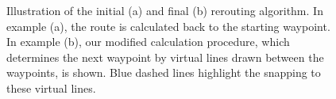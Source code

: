 \begin{figure}[t]
\centering
{}
\caption{Illustration of the initial (a) and final (b) rerouting algorithm. In example (a), the route is calculated back to the starting waypoint. In example (b), our modified calculation procedure, which determines the next waypoint by virtual lines drawn between the waypoints, is shown. Blue dashed lines highlight the snapping to these virtual lines.}
\label{fig:rerouting-strategy-comparison}
\end{figure}

